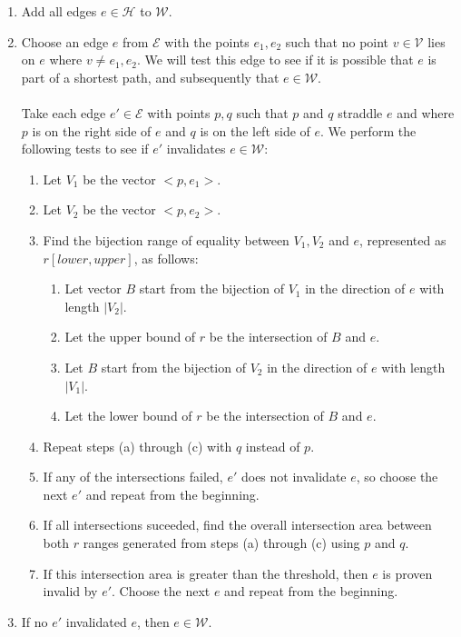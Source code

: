 \documentclass[12pt]{article}
\begin{document}
\begin{enumerate}
\item Add all edges $e \in \mathcal{H}$ to $\mathcal{W}$.
\item Choose an edge $e$ from $\mathcal{E}$ with the points $e_1,e_2$ such that
no point $v \in \mathcal{V}$ lies on $e$ where $v \neq e_1,e_2$.
We will test this edge to see if it is possible that $e$ is part of a shortest path,
and subsequently that $e \in \mathcal{W}$.
\\\\
Take each edge $e' \in \mathcal{E}$ with points $p,q$ such that $p$ and $q$ straddle
$e$ and where $p$ is on the right side
of $e$ and $q$ is on the left side of $e$.
We perform the following tests to see if $e'$ invalidates $e \in \mathcal{W}$:
\begin{enumerate}
\item Let $V_1$ be the vector $<p,e_1>$.
\item Let $V_2$ be the vector $<p,e_2>$.
\item Find the bijection range of equality between $V_1,V_2$ and $e$,
represented as $r[lower, upper]$, as follows:
\begin{enumerate}
\item Let vector $B$ start from the bijection of $V_1$
in the direction of $e$ with length $|V_2|$.
\item Let the upper bound of $r$ be the intersection of $B$ and $e$.
\item Let $B$ start from the bijection of $V_2$
in the direction of $e$ with length $|V_1|$.
\item Let the lower bound of $r$ be the intersection of $B$ and $e$.
\end{enumerate}
\item Repeat steps (a) through (c) with $q$ instead of $p$.
\item If any of the intersections failed, $e'$ does not invalidate $e$,
so choose the next $e'$ and repeat from the beginning.
\item If all intersections suceeded, find the overall intersection area between
both $r$ ranges generated from steps (a) through (c) using $p$ and $q$.
\item If this intersection area is greater than the threshold, then $e$ is proven
invalid by $e'$. Choose the next $e$ and repeat from the beginning.
\end{enumerate}
\item If no $e'$ invalidated $e$, then $e \in \mathcal{W}$.
\end{enumerate}
\end{document}
